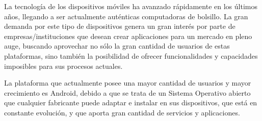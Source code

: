 \begin{comment}
Requisitos del proyecto y los problemas a encarar
Razón de ser del proyecto: aplicación, investigación, etc.
Especificaciones generales del proyecto.


introducción es una sección inicial que establece el propósito y los objetivos de todo el contenido posterior del escrito. En general va seguido del cuerpo o desarrollo del tema, y de las conclusiones.

En la introducción normalmente se describe el alcance del documento, y se da una breve explicación o resumen de éste. También puede explicar algunos antecedentes que son importantes para el posterior desarrollo del tema central. Un lector al leer una introducción debería poder hacerse una idea sobre el contenido del texto, antes de comenzar su lectura propiamente dicha.

En artículos técnicos, la introducción generalmente incluye una o más sub-secciones estándar, como lo son el resumen o síntesis, el prefacio y los agradecimientos. Alternativamente, la sección de introducción puede ser un capítulo más del trabajo en sí, dividido en las sub-secciones anteriormente mencionadas. Cuando el libro se divide en capítulos numerados, por convención la introducción y cualquier otro asunto delante de las secciones de cuerpo o desarrollo no se enumeran (o se enumeran de manera distinta) y preceden al capítulo 1.

El concepto de introducción es independiente del contenido del documento al cual introduce. Siempre debe presentar el objeto o problema a desarrollar, ya este se trate de una especificación formal, un producto, un personaje o un ente cualquiera.
\end{comment}

La tecnología de los dispositivos móviles ha avanzado rápidamente en los últimos años, llegando a ser actualmente auténticas computadoras de bolsillo. La gran demanda por este tipo de dispositivos genera un gran interés por parte de empresas/instituciones que desean crear aplicaciones para un mercado en pleno auge, buscando aprovechar no sólo la gran cantidad de usuarios de estas plataformas, sino también la posibilidad de ofrecer funcionalidades y capacidades imposibles para sus procesos actuales.

La plataforma que actualmente posee una mayor cantidad de usuarios y mayor crecimiento es Android, debido a que se trata de un Sistema Operativo abierto que cualquier fabricante puede adaptar e instalar en sus dispositivos, que está en constante evolución, y que aporta gran cantidad de servicios y aplicaciones. 

